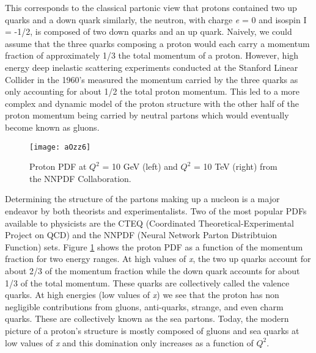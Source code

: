 \noindent
This corresponds to the classical partonic view that protons contained two up quarks and a down quark similarly, the neutron, with charge \textit{e} = 0 and isospin I = -1/2, is composed of two down quarks and an up quark.  Naively, we could assume that the three quarks composing a proton would each carry a momentum fraction of approximately 1/3 the total momentum of a proton.  However, high energy deep inelastic scattering experiments conducted at the Stanford Linear Collider in the 1960's\cite{Panofsky:871460} measured the momentum carried by the three quarks as only accounting for about 1/2 the total proton momentum.  This led to a more complex and dynamic model of the proton structure with the other half of the proton momentum being carried by neutral partons which would eventually become known as gluons.

\begin{figure}[h]
\texttt{[image: aOzz6]}
\centering
\caption{Proton PDF at $Q^{2}$ = 10 GeV (left) and  $Q^{2}$ = 10 TeV (right) from the NNPDF Collaboration\cite{Feltesse:2010}.}
\label{fig:PDFNNPDF}
\end{figure}

Determining the structure of the partons making up a nucleon is a major endeavor by both theorists and experimentalists.  Two of the most popular PDFs available to physicists are the CTEQ\cite{Kovarik:2013sya} (Coordinated Theoretical-Experimental Project on QCD) and the NNPDF\cite{Ball:1966481} (Neural Network Parton Distribtuion Function) sets.  Figure \ref{fig:PDFNNPDF} shows the proton PDF as a function of the momentum fraction for two energy ranges.  At high values of \textit{x}, the two up quarks account for about 2/3 of the momentum fraction while the down quark accounts for about 1/3 of the total momentum.  These quarks are collectively called the valence quarks.  At high energies (low values of \textit{x}) we see that the proton has non negligible contributions from gluons, anti-quarks, strange, and even charm quarks.  These are collectively known as the sea partons.  Today, the modern picture of a proton's structure is mostly composed of gluons and sea quarks at low values of \textit{x} and this domination only increases as a function of $Q^{2}$\cite{Fritzsch:1992mu}.

